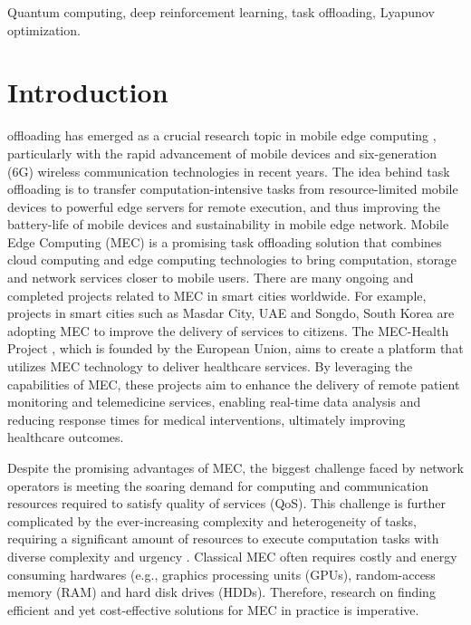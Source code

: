 \documentclass[journal]{IEEEtran}
\begin{document}
\begin{IEEEkeywords}
Quantum computing, deep reinforcement learning, task offloading, Lyapunov optimization.
\end{IEEEkeywords}

\section{Introduction}
 offloading has emerged as a crucial research topic in mobile edge computing \cite{kan2018task}, particularly with the rapid advancement of mobile devices and six-generation (6G) wireless communication technologies in recent years.
The idea behind task offloading is to transfer computation-intensive tasks from resource-limited mobile devices to powerful edge servers for remote execution\cite{mahenge2022energy}, and thus improving the battery-life of mobile devices and sustainability in mobile edge network.
Mobile Edge Computing (MEC) is a promising task offloading solution that combines cloud computing and edge computing technologies to bring computation, storage and network services closer to mobile users\cite{cheng2021research,mahenge2022energy,9575181,10032267}.
There are many ongoing and completed projects related to MEC in smart cities worldwide.
For example, projects in smart cities such as {Masdar City, UAE} and {Songdo, South Korea} are adopting MEC to improve the delivery of services to citizens.
The {MEC-Health Project} \cite{mechealth}, which is founded by the European Union, aims to create a platform that utilizes MEC technology to deliver healthcare services.
By leveraging the capabilities of MEC, these projects aim to enhance the delivery of remote patient monitoring and telemedicine services, enabling real-time data analysis and reducing response times for medical interventions, ultimately improving healthcare outcomes.


Despite the promising advantages of MEC, the biggest challenge faced by network operators is meeting the soaring demand for computing and communication resources required to satisfy quality of services (QoS).
This challenge is further complicated by the ever-increasing complexity and heterogeneity of tasks, requiring a significant amount of resources to execute computation tasks with diverse complexity and urgency \cite{al2017technologies}.
Classical MEC often requires costly and energy consuming hardwares (e.g., graphics processing units (GPUs), random-access memory (RAM) and hard disk drives (HDDs).
Therefore, research on finding efficient and yet cost-effective solutions for MEC in practice is imperative.
\end{document}
